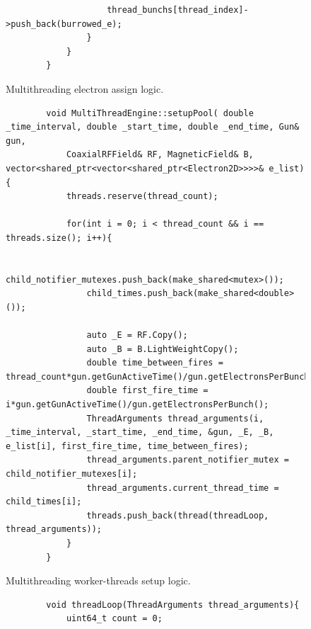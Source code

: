 \documentclass[a4paper,oneside,12pt]{report}
\numberwithin{equation}{chapter}
\begin{document}
{\begin{figure}[H]
\begin{verbatim}
                    thread_bunchs[thread_index]->push_back(burrowed_e);
                }
            }
        }
    \end{verbatim}
    \vspace{20pt}
    \caption{Multithreading electron assign logic.}
    \label{fig:fireAllWithFireTimesMT}
\end{figure}

\begin{figure}[H]
    \centering
    \begin{verbatim}
        void MultiThreadEngine::setupPool( double _time_interval, double _start_time, double _end_time, Gun& gun, 
            CoaxialRFField& RF, MagneticField& B, vector<shared_ptr<vector<shared_ptr<Electron2D>>>>& e_list){
            threads.reserve(thread_count);
        
            for(int i = 0; i < thread_count && i == threads.size(); i++){
        
                child_notifier_mutexes.push_back(make_shared<mutex>());
                child_times.push_back(make_shared<double>());
                
                auto _E = RF.Copy();
                auto _B = B.LightWeightCopy();
                double time_between_fires = thread_count*gun.getGunActiveTime()/gun.getElectronsPerBunch();
                double first_fire_time = i*gun.getGunActiveTime()/gun.getElectronsPerBunch();
                ThreadArguments thread_arguments(i, _time_interval, _start_time, _end_time, &gun, _E, _B, e_list[i], first_fire_time, time_between_fires);
                thread_arguments.parent_notifier_mutex = child_notifier_mutexes[i];
                thread_arguments.current_thread_time = child_times[i];
                threads.push_back(thread(threadLoop, thread_arguments));
            }
        }
    \end{verbatim}
    \vspace{20pt}
    \caption{Multithreading worker-threads setup logic.}
    \label{fig:setupPool}
\end{figure}
\vspace{20pt}
\begin{figure}[H]
    \centering
    \begin{verbatim}
        void threadLoop(ThreadArguments thread_arguments){
            uint64_t count = 0;
        

\end{verbatim}
\end{figure}}
\end{document}
